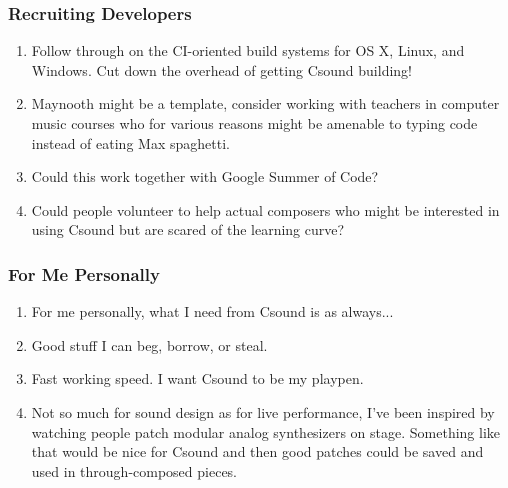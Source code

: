 \documentclass{beamer}
\begin{document}
\begin{frame}[allowframebreaks]
    \frametitle<presentation>{Recruiting Developers}
    \begin{enumerate}
        \item     
            Follow through on the CI-oriented build systems for OS X, Linux, 
and Windows. Cut down the overhead of getting Csound building!
        \item   
            Maynooth might be a template, consider working with teachers in 
computer music courses who for various reasons might be amenable to typing 
code instead of eating Max spaghetti.
        \item   
            Could this work together with Google Summer of Code?
        \item   
            Could people volunteer to help actual composers who might be 
interested in using Csound but are scared of the learning curve?
    \end{enumerate}    
\end{frame}

\begin{frame}[allowframebreaks]
    \frametitle<presentation>{For Me Personally}
    \begin{enumerate}
        \item     
            For me personally, what I need from Csound is as 
always...
        \item   
            Good stuff I can beg, borrow, or steal.
        \item   
            Fast working speed. I want Csound to be my playpen.
        \item   
            Not so much for sound design as for live performance, I've been 
inspired by watching people patch modular analog synthesizers on stage. 
Something like that would be nice for Csound and then good patches could be 
saved and used in through-composed pieces.
    \end{enumerate}    
\end{frame}
\end{document}
